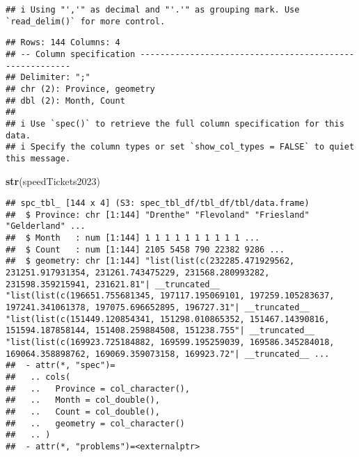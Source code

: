 \documentclass[
]{article}
\newenvironment{Shaded}{\begin{snugshade}}{\end{snugshade}}
\newcommand{\FunctionTok}[1]{\textcolor[rgb]{0.13,0.29,0.53}{\textbf{#1}}}
\newcommand{\NormalTok}[1]{#1}
\newcommand{\OtherTok}[1]{\textcolor[rgb]{0.56,0.35,0.01}{#1}}
\newcommand{\SpecialCharTok}[1]{\textcolor[rgb]{0.81,0.36,0.00}{\textbf{#1}}}
\begin{document}
\begin{verbatim}
## i Using "','" as decimal and "'.'" as grouping mark. Use `read_delim()` for more control.
\end{verbatim}

\begin{verbatim}
## Rows: 144 Columns: 4
## -- Column specification --------------------------------------------------------
## Delimiter: ";"
## chr (2): Province, geometry
## dbl (2): Month, Count
## 
## i Use `spec()` to retrieve the full column specification for this data.
## i Specify the column types or set `show_col_types = FALSE` to quiet this message.
\end{verbatim}

\begin{Shaded}
\end{Shaded}

\begin{Shaded}
\begin{Highlighting}[]
\FunctionTok{str}\NormalTok{(speedTickets2023)}
\end{Highlighting}
\end{Shaded}

\begin{verbatim}
## spc_tbl_ [144 x 4] (S3: spec_tbl_df/tbl_df/tbl/data.frame)
##  $ Province: chr [1:144] "Drenthe" "Flevoland" "Friesland" "Gelderland" ...
##  $ Month   : num [1:144] 1 1 1 1 1 1 1 1 1 1 ...
##  $ Count   : num [1:144] 2105 5458 790 22382 9286 ...
##  $ geometry: chr [1:144] "list(list(c(232285.471929562, 231251.917931354, 231261.743475229, 231568.280993282, 231598.359215941, 231621.81"| __truncated__ "list(list(c(196651.755681345, 197117.195069101, 197259.105283637, 197241.341061378, 197075.696652895, 196727.31"| __truncated__ "list(list(c(151449.120854341, 151298.010865352, 151467.14390816, 151594.187858144, 151408.259884508, 151238.755"| __truncated__ "list(list(c(169923.725184882, 169599.195259039, 169586.345284018, 169064.358898762, 169069.359073158, 169923.72"| __truncated__ ...
##  - attr(*, "spec")=
##   .. cols(
##   ..   Province = col_character(),
##   ..   Month = col_double(),
##   ..   Count = col_double(),
##   ..   geometry = col_character()
##   .. )
##  - attr(*, "problems")=<externalptr>
\end{verbatim}
\end{document}

